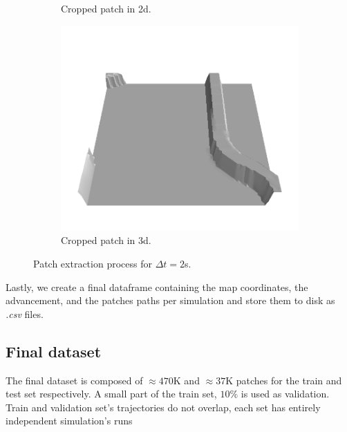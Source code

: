 \documentclass[../document.tex]{subfiles}
\begin{document}
\begin{figure}[htbp]
\begin{subfigure}[b]{0.45\textwidth}
        \caption{Cropped patch in 2d.}
    \end{subfigure}
    \begin{subfigure}[b]{0.45\textwidth}
        \includegraphics[width=\textwidth]{../img/3/crop/0.png}
        \caption{Cropped patch in 3d.}
    \end{subfigure}
\caption{Patch extraction process for $\Delta t = 2$s.}   
\end{figure}
Lastly, we create a final dataframe containing the map coordinates, the advancement, and the patches paths per simulation and store them to disk as \emph{.csv} files. 

\subsection{Final dataset}
The final dataset is composed of $\approx470$K and $\approx 37$K patches for the train and test set respectively. A small part of the train set, $10\%$ is used as validation. Train and validation set's trajectories do not overlap, each set has entirely independent simulation's runs
\end{document}
